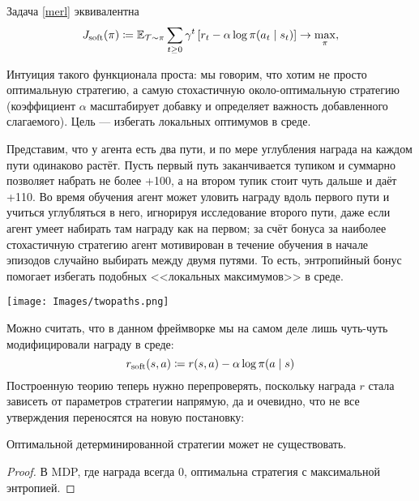 \begin{proposition}
Задача \eqref{merl} эквивалентна
\begin{equation*}
    J_{\mathrm{soft}}(\pi) \coloneqq \mathbb{E}_{\mathcal{T} \sim \pi} \sum_{t \ge 0} \gamma^t \left[ r_t - \alpha \log \pi(a_t \mid s_t) \right] \to \max_\pi,
\end{equation*}
\end{proposition}

Интуиция такого функционала проста: мы говорим, что хотим не просто оптимальную стратегию, а самую стохастичную около-оптимальную стратегию (коэффициент $\alpha$ масштабирует добавку и определяет важность добавленного слагаемого). Цель --- избегать локальных оптимумов в среде. 

\begin{exampleBox}[righthand ratio=0.3, sidebyside, sidebyside align=center, lower separated=false]{}
Представим, что у агента есть два пути, и по мере углубления награда на каждом пути одинаково растёт. Пусть первый путь заканчивается тупиком и суммарно позволяет набрать не более +100, а на втором тупик стоит чуть дальше и даёт +110. Во время обучения агент может уловить награду вдоль первого пути и учиться углубляться в него, игнорируя исследование второго пути, даже если агент умеет набирать там награду как на первом; за счёт бонуса за наиболее стохастичную стратегию агент мотивирован в течение обучения в начале эпизодов случайно выбирать между двумя путями. То есть, энтропийный бонус помогает избегать подобных <<локальных максимумов>> в среде.

\tcblower
\texttt{[image: Images/twopaths.png]}
\end{exampleBox}

Можно считать, что в данном фреймворке мы на самом деле лишь чуть-чуть модифицировали награду в среде:
\begin{equation}\label{softreward}
r_{\mathrm{soft}}(s, a) \coloneqq r(s, a) - \alpha \log \pi(a \mid s)
\end{equation}
Построенную теорию теперь нужно перепроверять, поскольку награда $r$ стала зависеть от параметров стратегии напрямую, да и очевидно, что не все утверждения переносятся на новую постановку:

\begin{proposition}
Оптимальной детерминированной стратегии может не существовать.
\begin{proof}
В MDP, где награда всегда 0, оптимальна стратегия с максимальной энтропией.
\end{proof}
\end{proposition}

